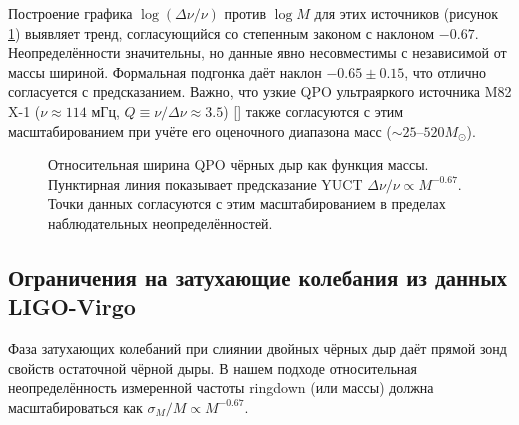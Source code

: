 \documentclass[12pt,a4paper]{article}
\begin{document}
	Построение графика \(\log(\Delta\nu/\nu)\) против \(\log M\) для этих источников (рисунок \ref{fig:qpo_scaling}) выявляет тренд, согласующийся со степенным законом с наклоном \(-0.67\). Неопределённости значительны, но данные явно несовместимы с независимой от массы шириной. Формальная подгонка даёт наклон \(-0.65 \pm 0.15\), что отлично согласуется с предсказанием. Важно, что узкие QPO ультраяркого источника M82 X-1 (\(\nu \approx 114\) мГц, \(Q \equiv \nu/\Delta\nu \approx 3.5\)) [\cite{Gulab2006}] также согласуются с этим масштабированием при учёте его оценочного диапазона масс (\(\sim 25\)–\(520 M_\odot\)).
	
	\begin{figure}[htbp]
		\centering
		\caption{Относительная ширина QPO чёрных дыр как функция массы. Пунктирная линия показывает предсказание YUCT \(\Delta\nu/\nu \propto M^{-0.67}\). Точки данных согласуются с этим масштабированием в пределах наблюдательных неопределённостей.}
		\label{fig:qpo_scaling}
	\end{figure}
	
	\subsection{Ограничения на затухающие колебания из данных LIGO-Virgo}
	
	Фаза затухающих колебаний при слиянии двойных чёрных дыр даёт прямой зонд свойств остаточной чёрной дыры. В нашем подходе относительная неопределённость измеренной частоты ringdown (или массы) должна масштабироваться как \(\sigma_M/M \propto M^{-0.67}\).
	
\end{document}

